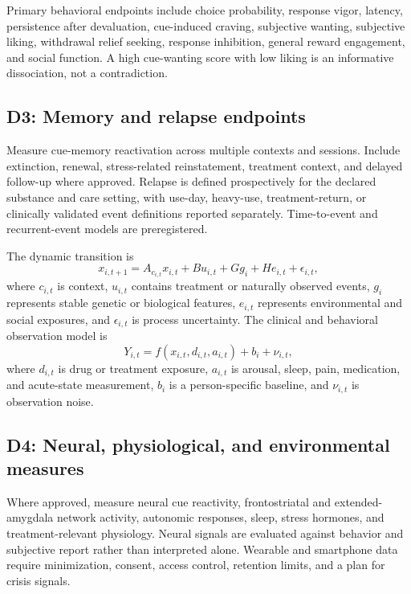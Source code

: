 \documentclass[conference]{IEEEtran}
\begin{document}
Primary behavioral endpoints include choice probability, response vigor, latency, persistence after devaluation, cue-induced craving, subjective wanting, subjective liking, withdrawal relief seeking, response inhibition, general reward engagement, and social function. A high cue-wanting score with low liking is an informative dissociation, not a contradiction.

\subsection{D3: Memory and relapse endpoints}
Measure cue-memory reactivation across multiple contexts and sessions. Include extinction, renewal, stress-related reinstatement, treatment context, and delayed follow-up where approved. Relapse is defined prospectively for the declared substance and care setting, with use-day, heavy-use, treatment-return, or clinically validated event definitions reported separately. Time-to-event and recurrent-event models are preregistered.

The dynamic transition is
\begin{equation}
x_{i,t+1}=A_{c_{i,t}}x_{i,t}+B u_{i,t}+G g_i+H e_{i,t}+\epsilon_{i,t},
\label{eq:state_transition}
\end{equation}
where $c_{i,t}$ is context, $u_{i,t}$ contains treatment or naturally observed events, $g_i$ represents stable genetic or biological features, $e_{i,t}$ represents environmental and social exposures, and $\epsilon_{i,t}$ is process uncertainty. The clinical and behavioral observation model is
\begin{equation}
Y_{i,t}=f(x_{i,t},d_{i,t},a_{i,t})+b_i+\nu_{i,t},
\label{eq:outcome_model}
\end{equation}
where $d_{i,t}$ is drug or treatment exposure, $a_{i,t}$ is arousal, sleep, pain, medication, and acute-state measurement, $b_i$ is a person-specific baseline, and $\nu_{i,t}$ is observation noise.

\subsection{D4: Neural, physiological, and environmental measures}
Where approved, measure neural cue reactivity, frontostriatal and extended-amygdala network activity, autonomic responses, sleep, stress hormones, and treatment-relevant physiology. Neural signals are evaluated against behavior and subjective report rather than interpreted alone. Wearable and smartphone data require minimization, consent, access control, retention limits, and a plan for crisis signals.
\end{document}
